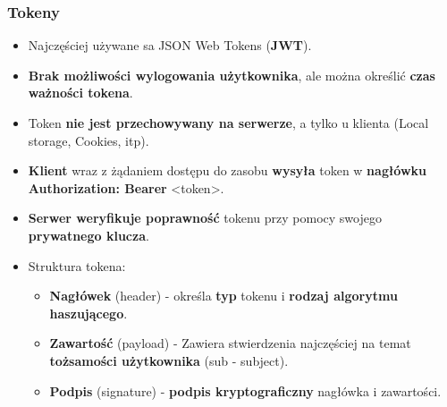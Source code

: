 \documentclass[../main.tex]{subfiles}
\begin{document}
    \subsubsection{Tokeny}
    \begin{itemize}
        \item Najczęściej używane sa JSON Web Tokens (\textbf{JWT}).
        \item \textbf{Brak możliwości wylogowania użytkownika}, ale można określić \textbf{czas ważności tokena}.
        \item Token \textbf{nie jest przechowywany na serwerze}, a tylko u klienta (Local storage, Cookies, itp).
        \item \textbf{Klient} wraz z żądaniem dostępu do zasobu \textbf{wysyła} token w \textbf{nagłówku Authorization: Bearer} <token>.
        \item \textbf{Serwer weryfikuje poprawność} tokenu przy pomocy swojego \textbf{prywatnego klucza}.
        \item Struktura tokena:
        \begin{itemize}
            \item \textbf{Nagłówek} (header) - określa \textbf{typ} tokenu i \textbf{rodzaj algorytmu haszującego}.
            \item \textbf{Zawartość} (payload) - Zawiera stwierdzenia najczęściej na temat
            \textbf{tożsamości użytkownika} (sub - subject).
            \item \textbf{Podpis} (signature) - \textbf{podpis kryptograficzny} nagłówka i zawartości.
        \end{itemize}
    \end{itemize}
\end{document}
